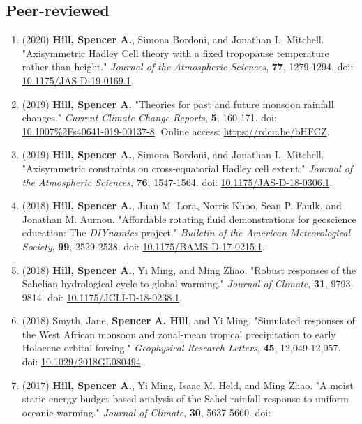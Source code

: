 \documentclass[12pt,letterpaper]{shillcv}
\begin{document}
\subsection*{Peer-reviewed}
\label{sec:org8ae55b7}
\begin{enumerate}
\item (2020) \textbf{Hill, Spencer A.}, Simona Bordoni, and Jonathan L. Mitchell.
"Axisymmetric Hadley Cell theory with a fixed tropopause temperature rather
than height."  \emph{Journal of the Atmospheric Sciences}, \textbf{77}, 1279-1294.  doi:
\href{https://doi.org/10.1175/JAS-D-19-0169.1}{10.1175/JAS-D-19-0169.1}.
\item (2019) \textbf{Hill, Spencer A.} "Theories for past and future monsoon rainfall
changes."  \emph{Current Climate Change Reports}, \textbf{5}, 160-171.  doi:
\href{https://doi.org/10.1007\%2Fs40641-019-00137-8}{10.1007\%2Fs40641-019-00137-8}.  Online access: \url{https://rdcu.be/bHFCZ}.
\item (2019) \textbf{Hill, Spencer A.}, Simona Bordoni, and Jonathan L. Mitchell.
"Axisymmetric constraints on cross-equatorial Hadley cell extent."
\emph{Journal of the Atmospheric Sciences}, \textbf{76}, 1547-1564.  doi: \href{https://doi.org/10.1175/JAS-D-18-0306.1}{10.1175/JAS-D-18-0306.1}.
\item (2018) \textbf{Hill, Spencer A.}, Juan M. Lora, Norris Khoo, Sean P. Faulk, and
Jonathan M.  Aurnou.  "Affordable rotating fluid demonstrations for
geoscience education: The \emph{DIYnamics} project."  \emph{Bulletin of the
American Meteorological Society}, \textbf{99}, 2529-2538.  doi:
\href{https://doi.org/10.1175/BAMS-D-17-0215.1}{10.1175/BAMS-D-17-0215.1}.
\item (2018) \textbf{Hill, Spencer A.}, Yi Ming, and Ming Zhao.  "Robust responses of the
Sahelian hydrological cycle to global warming."  \emph{Journal of
Climate}, \textbf{31}, 9793-9814.  doi: \href{https://doi.org/10.1175/JCLI-D-18-0238.1}{10.1175/JCLI-D-18-0238.1}.
\item (2018) Smyth, Jane, \textbf{Spencer A. Hill}, and Yi Ming.  "Simulated responses of
the West African monsoon and zonal-mean tropical precipitation to early
Holocene orbital forcing."  \emph{Geophysical Research Letters}, \textbf{45},
12,049-12,057.  doi: \href{https://doi.org/10.1029/2018GL080494}{10.1029/2018GL080494}.
\item (2017) \textbf{Hill, Spencer A.}, Yi Ming, Isaac M. Held, and Ming Zhao.  "A moist
static energy budget-based analysis of the Sahel rainfall response to uniform
oceanic warming."  \emph{Journal of Climate}, \textbf{30}, 5637-5660.  doi:

\end{enumerate}
\end{document}
